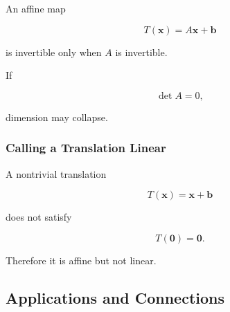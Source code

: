 An affine map

\[ T(\mathbf{x})=A\mathbf{x}+\mathbf{b} \]

is invertible only when \(A\) is invertible.

If

\[ \det A=0, \]

dimension may collapse.

\subsubsection{Calling a Translation Linear}

A nontrivial translation

\[ T(\mathbf{x})=\mathbf{x}+\mathbf{b} \]

does not satisfy

\[ T(\mathbf{0})=\mathbf{0}. \]

Therefore it is affine but not linear.

\subsection{Applications and Connections}
\label{subsec:affine-geometry-applications}

